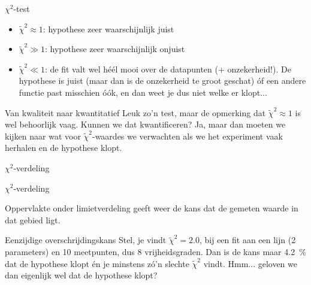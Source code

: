 \documentclass{beamer}
\newcommand{\rchisq}{\tilde\chi^2}
\begin{document}
\begin{frame}{$\chi^2$-test}
  \begin{itemize}
    \item $\rchisq \approx 1$: hypothese zeer waarschijnlijk juist
    \item $\rchisq \gg 1$: hypothese zeer waarschijnlijk onjuist
    \item $\rchisq \ll 1$: de fit valt wel héél mooi over de datapunten (+ onzekerheid!). De hypothese is juist (maar dan is de onzekerheid te groot geschat) óf een andere functie past misschien óók, en dan weet je dus niet welke er klopt...
  \end{itemize}
\end{frame}

\begin{frame}{Van kwaliteit naar kwantitatief}
  Leuk zo'n test, maar de opmerking dat $\rchisq \approx 1$ is wel behoorlijk vaag. Kunnen we dat kwantificeren? Ja, maar dan moeten we kijken naar wat voor $\rchisq$-waardes we verwachten als we het experiment vaak herhalen en de hypothese klopt.
\end{frame}

\begin{frame}{$\chi^2$-verdeling}
  \begin{center}





  \end{center}
\end{frame}

\begin{frame}{$\chi^2$-verdeling}
  \begin{center}
    
  \end{center}
  Oppervlakte onder limietverdeling geeft weer de kans dat de gemeten waarde in dat gebied ligt.
\end{frame}

\begin{frame}{Eenzijdige overschrijdingskans}
  Stel, je vindt $\rchisq = \num{2,0}$, bij een fit aan een lijn (2 parameters) en 10 meetpunten, dus 8 vrijheidsgraden. Dan is de kans maar \SI{4,2}{\percent} dat de hypothese klopt én je minstens zó'n slechte $\rchisq$ vindt. Hmm... geloven we dan eigenlijk wel dat de hypothese klopt?
\end{frame}
\end{document}
